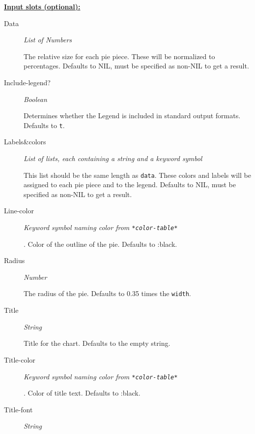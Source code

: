 \documentclass [11pt]{book}
\begin{document}
\begin{itemize}
\textbf{
\underline{Input slots (optional):}}

\begin{description}

\item [Data]
\emph{List of Numbers}

 The relative size for each pie piece. These will be normalized to percentages.
Defaults to NIL, must be specified as non-NIL to get a result.




\item [Include-legend?]
\emph{Boolean}

 Determines whether the Legend is included in standard output formats. Defaults to \texttt{t}.




\item [Labels\&colors]
\emph{List of lists, each containing a string and a keyword symbol}

 This list should be the same
length as \texttt{data}. These colors and labels will be assigned to each pie piece and to the legend.
Defaults to NIL, must be specified as non-NIL to get a result.




\item [Line-color]
\emph{Keyword symbol naming color from \texttt{*color-table*}}

.
Color of the outline of the pie. Defaults to :black.




\item [Radius]
\emph{Number}

 The radius of the pie. Defaults to 0.35 times the \texttt{width}.




\item [Title]
\emph{String}

 Title for the chart. Defaults to the empty string.




\item [Title-color]
\emph{Keyword symbol naming color from \texttt{*color-table*}}

.
Color of title text. Defaults to :black.




\item [Title-font]
\emph{String}


\end{description}
\end{itemize}
\end{document}
